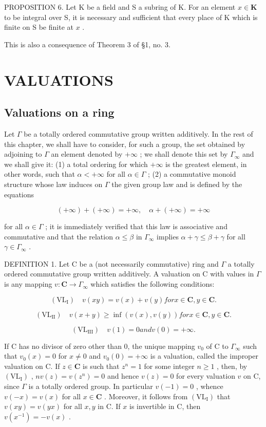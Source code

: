 PROPOSITION 6. Let K be a field and S a subring of K. For an element \(x \in \mathbf{K}\) to be integral over S, it is necessary and sufficient that every place of K which is finite on S be finite at \(x\) .

This is also a consequence of Theorem 3 of §1, no. 3.

\section{VALUATIONS}

\subsection{Valuations on a ring}

Let \(\Gamma\) be a totally ordered commutative group written additively. In the rest of this chapter, we shall have to consider, for such a group, the set obtained by adjoining to \(\Gamma\) an element denoted by \(+\infty\) ; we shall denote this set by \(\Gamma_{\infty}\) and we shall give it: (1) a total ordering for which \(+\infty\) is the greatest element, in other words, such that \(\alpha < +\infty\) for all \(\alpha \in \Gamma\) ; (2) a commutative monoid structure whose law induces on \(\Gamma\) the given group law and is defined by the equations

\[
(+ \infty) + (+ \infty) = + \infty , \quad \alpha + (+ \infty) = + \infty
\]

for all \(\alpha \in \Gamma\) ; it is immediately verified that this law is associative and commutative and that the relation \(\alpha \leqslant \beta\) in \(\Gamma_{\infty}\) implies \(\alpha + \gamma \leqslant \beta + \gamma\) for all \(\gamma \in \Gamma_{\infty}\) .

DEFINITION 1. Let C be a (not necessarily commutative) ring and \(\Gamma\) a totally ordered commutative group written additively. A valuation on C with values in \(\Gamma\) is any mapping \(v: \mathbf{C} \to \Gamma_{\infty}\) which satisfies the following conditions:

\[
(\mathrm{VL}_{\mathrm{I}}) \quad v (x y) = v (x) + v (y) for x \in \mathbf {C}, y \in \mathbf {C}.
\]

\[
(\mathrm{VL}_{\mathrm{II}}) \quad v (x + y) \geqslant \inf (v (x), v (y)) for x \in \mathbf {C}, y \in \mathbf {C}.
\]

\[
(\mathrm{VL} _ {\mathrm{III}}) \quad v (1) = 0 and v (0) = + \infty .
\]

If C has no divisor of zero other than 0, the unique mapping \(v_0\) of C to \(\Gamma_\infty\) such that \(v_0(x) = 0\) for \(x \neq 0\) and \(v_0(0) = +\infty\) is a valuation, called the improper valuation on C. If \(z \in \mathbf{C}\) is such that \(z^n = 1\) for some integer \(n \geqslant 1\) , then, by \((\mathrm{VL}_{\mathrm{I}})\) , \(nv(z) = v(z^n) = 0\) and hence \(v(z) = 0\) for every valuation \(v\) on C, since \(\Gamma\) is a totally ordered group. In particular \(v(-1) = 0\) , whence \(v(-x) = v(x)\) for all \(x \in \mathbf{C}\) . Moreover, it follows from \((\mathrm{VL}_{\mathrm{I}})\) that \(v(xy) = v(yx)\) for all \(x, y\) in C. If \(x\) is invertible in C, then \(v(x^{-1}) = -v(x)\) .


